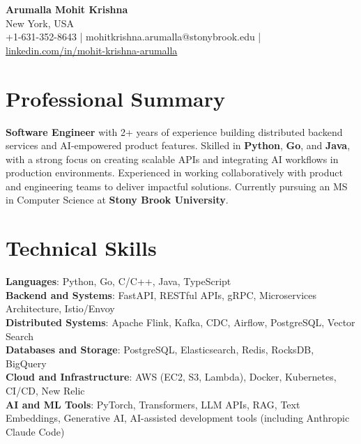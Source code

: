 \documentclass[letterpaper,11pt]{article}
\begin{document}
\begin{center}
  {\Large \textbf{Arumalla Mohit Krishna}} \\
  New York, USA \\
  +1-631-352-8643 \enspace | \enspace mohitkrishna.arumalla@stonybrook.edu \enspace | \enspace \href{https://www.linkedin.com/in/mohit-krishna-arumalla}{linkedin.com/in/mohit-krishna-arumalla}
\end{center}

\section{Professional Summary}
  \begin{itemize}[leftmargin=0.15in, label={}]
    \small{\item{
     \textbf{Software Engineer} with 2+ years of experience building distributed backend services and AI-empowered product features. Skilled in \textbf{Python}, \textbf{Go}, and \textbf{Java}, with a strong focus on creating scalable APIs and integrating AI workflows in production environments. Experienced in working collaboratively with product and engineering teams to deliver impactful solutions. Currently pursuing an MS in Computer Science at \textbf{Stony Brook University}.
    }}
  \end{itemize}
\vspace{-16pt}

\section{Technical Skills}
 \begin{itemize}[leftmargin=0.15in, label={}]
    \small{\item{
     \textbf{Languages}: Python, Go, C/C++, Java, TypeScript \\
     \textbf{Backend and Systems}: FastAPI, RESTful APIs, gRPC, Microservices Architecture, Istio/Envoy \\
     \textbf{Distributed Systems}: Apache Flink, Kafka, CDC, Airflow, PostgreSQL, Vector Search \\
     \textbf{Databases and Storage}: PostgreSQL, Elasticsearch, Redis, RocksDB, BigQuery \\
     \textbf{Cloud and Infrastructure}: AWS (EC2, S3, Lambda), Docker, Kubernetes, CI/CD, New Relic \\
     \textbf{AI and ML Tools}: PyTorch, Transformers, LLM APIs, RAG, Text Embeddings, Generative AI, AI-assisted development tools (including Anthropic Claude Code)
    }}
 \end{itemize}
\vspace{-16pt}
\end{document}
